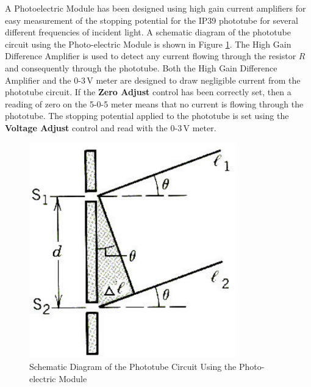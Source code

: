 A Photoelectric Module has been designed using high gain current amplifiers for easy measurement of the stopping potential for the IP39 phototube for several different frequencies of incident light. A schematic diagram of the phototube circuit using the Photo-electric Module is shown in Figure {\ref{fig:circuit}}. The High Gain Difference Amplifier is used to detect any current flowing through the resistor $R$ and consequently through the phototube. Both the High Gain Difference Amplifier and the $0$-$3\,\mathrm{V}$ meter are designed to draw negligible current from the phototube circuit. If the \textbf{Zero Adjust} control has been correctly set, then a reading of zero on the 5-0-5 meter means that no current is flowing through the phototube. The stopping potential applied to the phototube is set using the \textbf{Voltage Adjust} control and read with the $0$-$3\,\mathrm{V}$ meter.
\begin{figure}[h]
\centering
\includegraphics[width=0.8\textwidth]{./Exp8/pic/image4.png}
\caption{Schematic Diagram of the Phototube Circuit Using the Photo-electric Module}
\label{fig:circuit}
\end{figure} 

